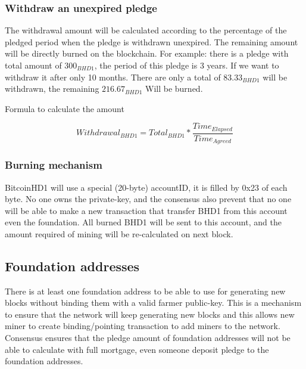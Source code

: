 \subsubsection{Withdraw an unexpired pledge}
\begin{flushleft}
    The withdrawal amount will be calculated according to the percentage of the pledged period when the pledge is withdrawn unexpired. The remaining amount will be directly burned on the blockchain. For example: there is a  pledge with total amount of $300_{BHD1}$, the period of this pledge is 3 years. If we want to withdraw it after only 10 months. There are only a total of $83.33_{BHD1}$ will be withdrawn, the remaining $216.67_{BHD1}$ Will be burned.
\end{flushleft}
\begin{flushleft}
    Formula to calculate the amount
\end{flushleft}
\begin{equation}
    Withdrawal_{BHD1} = Total_{BHD1} * \frac{Time_{Elapsed}}{Time_{Agreed}}
\end{equation}
\subsubsection{Burning mechanism}
\begin{flushleft}
    BitcoinHD1 will use a special (20-byte) accountID, it is filled by 0x23 of each byte. No one owns the private-key, and the consensus also prevent that no one will be able to make a new transaction that transfer BHD1 from this account even the foundation. All burned BHD1 will be sent to this account, and the amount required of mining will be re-calculated on next block.
\end{flushleft}
\subsection{Foundation addresses}
\begin{flushleft}
    There is at least one foundation address to be able to use for generating new blocks without binding them with a valid farmer public-key. This is a mechanism to ensure that the network will keep generating new blocks and this allows new miner to create binding/pointing transaction to add miners to the network. Consensus ensures that the pledge amount of foundation addresses will not be able to calculate with full mortgage, even someone deposit pledge to the foundation addresses.
\end{flushleft}
